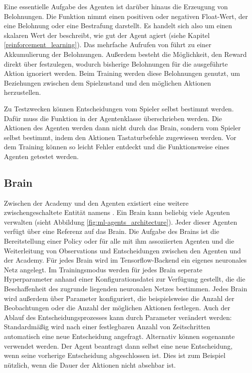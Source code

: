 Eine essentielle Aufgabe des Agenten ist darüber hinaus die Erzeugung von Belohnungen. Die Funktion  nimmt einen positiven oder negativen Float-Wert, der eine Belohnung oder eine Bestrafung darstellt. Es handelt sich also um einen skalaren Wert der beschreibt, wie gut der Agent agiert (siehe Kapitel \ref{reinforcement_learning}). Das mehrfache Aufrufen von  führt zu einer Akkumulierung der Belohnungen. Außerdem besteht die Möglichkeit, den Reward direkt über  festzulegen, wodurch bisherige Belohnungen für die ausgeführte Aktion ignoriert werden. Beim Training werden diese Belohnungen genutzt, um Beziehungen zwischen dem Spielzustand und den möglichen Aktionen herzustellen.

Zu Testzwecken können Entscheidungen vom Spieler selbst bestimmt werden. Dafür muss die Funktion  in der Agentenklasse überschrieben werden. Die Aktionen des Agenten werden dann nicht durch das Brain, sondern vom Spieler selbst bestimmt, indem den Aktionen Tastaturbefehle zugewiesen werden. Vor dem Training können so leicht Fehler entdeckt und die Funktionsweise eines Agenten getestet werden.

\subsection{Brain}
Zwischen der Academy und den Agenten existiert eine weitere zwischengeschaltete Entität namens . Ein Brain kann beliebig viele Agenten verwalten (sieht Abbildung \ref{fig:ml-agents_architecture}). Jeder dieser Agenten verfügt über eine Referenz auf das Brain. Die Aufgabe des Brains ist die Bereitstellung einer Policy oder  für alle mit ihm assoziierten Agenten und die Weiterleitung von Observations und Entscheidungen zwischen den Agenten und der Academy. Für jedes Brain wird im Tensorflow-Backend ein eigenes neuronales Netz angelegt.
Im Trainingsmodus werden für jedes Brain seperate Hyperparameter anhand einer Konfigurationsdatei zur Verfügung gestellt, die die Beschaffenheit des zugrunde liegenden neuronalen Netzes bestimmen. Jedes Brain wird außerdem über Parameter konfiguriert, die beispielsweise die Anzahl der Beobachtungen oder die Anzahl der möglichen Aktionen festlegen. Auch der Ablauf des Entscheidungsprozesses kann durch Parameter verändert werden: Standardmäßig wird nach einer festlegbaren Anzahl von Zeitschritten automatisch eine neue Entscheidung angefragt. Alternativ können sogenannte  verwendet werden. Der Agent beantragt dann selbst eine neue Entscheidung, wenn seine vorherige Entscheidung abgeschlossen ist. Dies ist zum Beispiel nützlich, wenn die Dauer der Aktionen nicht absehbar ist.

